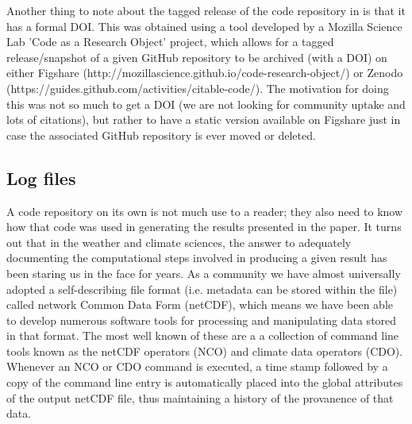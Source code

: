 Another thing to note about the tagged release of the code repository in \citet{Irving2015} is that it has a formal DOI. This was obtained using a tool developed by a Mozilla Science Lab 'Code as a Research Object' project, which allows for a tagged release/snapshot of a given GitHub repository to be archived (with a DOI) on either Figshare (http://mozillascience.github.io/code-research-object/) or Zenodo (https://guides.github.com/activities/citable-code/). The motivation for doing this was not so much to get a DOI (we are not looking for community uptake and lots of citations), but rather to have a static version available on Figshare just in case the associated GitHub repository is ever moved or deleted.  

\subsection{Log files}\label{s:log_files}

A code repository on its own is not much use to a reader; they also need to know how that code was used in generating the results presented in the paper. It turns out that in the weather and climate sciences, the answer to adequately documenting the computational steps involved in producing a given result has been staring us in the face for years. As a community we have almost universally adopted a self-describing file format (i.e. metadata can be stored within the file) called network Common Data Form (netCDF), which means we have been able to develop numerous software tools for processing and manipulating data stored in that format. The most well known of these are a a collection of command line tools known as the netCDF operators (NCO) and climate data operators (CDO). Whenever an NCO or CDO command is executed, a time stamp followed by a copy of the command line entry is automatically placed into the global attributes of the output netCDF file, thus maintaining a history of the provanence of that data.

